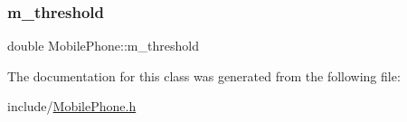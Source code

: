 \mbox{\label{class_mobile_phone_afb6364675f7cf6e09856f49ae6c10563}} 
\subsubsection{\texorpdfstring{m\+\_\+threshold}{m\_threshold}}
{\footnotesize\ttfamily double Mobile\+Phone\+::m\+\_\+threshold\hspace{0.3cm}{\ttfamily [private]}}



The documentation for this class was generated from the following file\+:\begin{DoxyCompactItemize}
\item 
include/\hyperlink{_mobile_phone_8h}{Mobile\+Phone.\+h}\end{DoxyCompactItemize}
